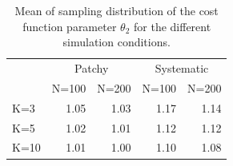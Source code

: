 \documentclass[12pt]{article}
\begin{document}
\begin{spacing}{1.2}
\begin{table}[ht]
\centering
\caption{
Mean of sampling distribution of the cost function parameter
$\theta_{2}$ for the different simulation
conditions. 
}
\begin{tabular}{l|rrrr}
 & \multicolumn{2}{c}{Patchy} & \multicolumn{2}{c}{Systematic} \\
    & N=100 &  N=200  &   N=100 &  N=200  \\ \hline
K=3 &   1.05&    1.03 &     1.17 & 1.14 \\
K=5 &   1.02&    1.01 &     1.12 &1.12 \\
K=10&   1.01&    1.00 &     1.10 &1.08 \\
\end{tabular}
\label{tab.results2}
\end{table}











\end{spacing}
\end{document}
